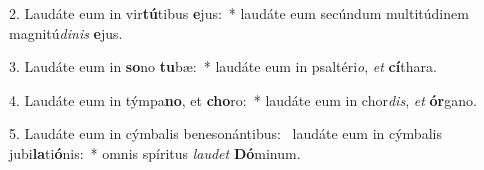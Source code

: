 2. Laudáte eum in vir\textbf{tú}tibus \textbf{e}jus:~*  laudáte eum secúndum multitúdinem magnitú\textit{di}\textit{nis} \textbf{e}jus.\

3. Laudáte eum in \textbf{so}no \textbf{tu}bæ:~*  laudáte eum in psaltéri\textit{o}, \textit{et} \textbf{cí}thara.\

4. Laudáte eum in týmpa\textbf{no}, et \textbf{cho}ro:~*  laudáte eum in chor\textit{dis}, \textit{et} \textbf{ór}gano.\

5. Laudáte eum in cýmbalis benesonántibus: \dag\  laudáte eum in cýmbalis jubi\textbf{la}ti\textbf{ó}nis:~*  omnis spíritus \textit{lau}\textit{det} \textbf{Dó}minum.\

